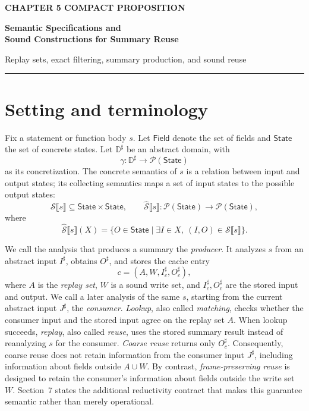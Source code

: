 \documentclass[10pt]{article}
\newcommand{\Field}{\mathsf{Field}}
\newcommand{\State}{\mathsf{State}}
\newcommand{\Semantics}[1]{\mathcal S\mathopen{⟦}#1\mathclose{⟧}}
\newcommand{\CollectingSemantics}[1]{\widehat{\mathcal S}\mathopen{⟦}#1\mathclose{⟧}}
\begin{document}
{\sffamily\bfseries\color{proofred}\fontsize{10.5}{13}\selectfont CHAPTER 5 COMPACT PROPOSITION\par}
\vspace{4mm}
{\sffamily\bfseries\fontsize{23}{27}\selectfont
Semantic Specifications and\\
Sound Constructions for Summary Reuse\par}
\vspace{4mm}
{\color{muted}\large Replay sets, exact filtering, summary production, and sound reuse\par}
\vspace{4mm}
{\color{proofred}\rule{\textwidth}{1pt}\par}

\section{Setting and terminology}

Fix a statement or function body \(s\). Let \(\Field\) denote the set of fields and
\(\State\) the set of concrete states. Let \(\mathbb D^\sharp\) be an abstract domain, with
\[
  \gamma:\mathbb D^\sharp\to\mathcal P(\State)
\]
as its concretization. The concrete semantics of \(s\) is a relation between input and output
states; its collecting semantics maps a set of input states to the possible output states:
\[
  \Semantics{s}\subseteq\State\times\State,
  \qquad
  \CollectingSemantics{s}:\mathcal P(\State)\to\mathcal P(\State),
\]
where
\[
  \CollectingSemantics{s}(X)
  =\{O\in\State\mid \exists I\in X,\ (I,O)\in\Semantics{s}\}.
\]

We call the analysis that produces a summary the \emph{producer}. It analyzes \(s\) from an
abstract input \(I^\sharp\), obtains \(O^\sharp\), and stores the cache entry
\[
  c=(A,W,I_c^\sharp,O_c^\sharp),
\]
where \(A\) is the \emph{replay set}, \(W\) is a sound write set, and
\(I_c^\sharp,O_c^\sharp\) are the stored input and output. We call a later analysis of the
same \(s\), starting from the current abstract input \(J^\sharp\), the \emph{consumer}.
\emph{Lookup}, also called \emph{matching}, checks whether the consumer input and the stored
input agree on the replay set \(A\). When lookup succeeds, \emph{replay}, also called
\emph{reuse}, uses the stored summary result instead of reanalyzing \(s\) for the consumer.
\emph{Coarse reuse} returns only \(O_c^\sharp\). Consequently, coarse reuse does not retain
information from the consumer input \(J^\sharp\), including information about fields outside
\(A\cup W\). By contrast, \emph{frame-preserving reuse} is designed to retain the consumer's
information about fields outside the write set \(W\). Section~7 states the additional
reductivity contract that makes this guarantee semantic rather than merely operational.
\end{document}
